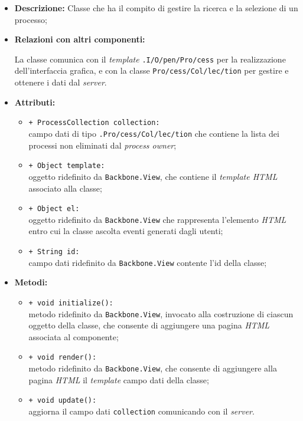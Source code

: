 \begin{flushleft}
\begin{itemize}
\item \textbf{Descrizione:} Classe che ha il compito di gestire la ricerca e la selezione di un processo;
\item \textbf{Relazioni con altri componenti:}
\begin{sloppypar}
La classe comunica con il \textit{template} \texttt{\viewAdmin{}.I\fshyp{}O\fshyp{}pen\fshyp{}Pro\fshyp{}cess} per la realizzazione dell'interfaccia grafica, e con la classe \texttt{\collection{}Pro\fshyp{}cess\fshyp{}Col\fshyp{}lec\fshyp{}tion} per gestire e ottenere i dati dal \textit{server}.
\end{sloppypar}
\item \textbf{Attributi:}
\begin{sloppypar}
\begin{itemize}
\item \texttt{+ ProcessCollection collection:}\\ campo dati di tipo \texttt{\collection{}.Pro\fshyp{}cess\fshyp{}Col\fshyp{}lec\fshyp{}tion} che contiene la lista dei processi non eliminati dal \textit{process owner};
\item \texttt{+ Object template:}\\ oggetto ridefinito da \texttt{Backbone.View}, che contiene il \textit{template HTML} associato alla classe;
\item \texttt{+ Object el:}\\ oggetto ridefinito da \texttt{Backbone.View} che rappresenta l'elemento \textit{HTML} entro cui la classe ascolta eventi generati dagli utenti;
\item \texttt{+ String id:}\\ campo dati ridefinito da \texttt{Backbone.View} contente l'id della classe;
\end{itemize}
\end{sloppypar}
\item \textbf{Metodi:}
\begin{sloppypar}
\begin{itemize}
\item \texttt{+ void initialize():}\\ metodo ridefinito da \texttt{Backbone.View}, invocato alla costruzione di ciascun oggetto della classe, che consente di aggiungere una pagina \textit{HTML} associata al componente;
\item \texttt{+ void render():}\\ metodo ridefinito da \texttt{Backbone.View}, che consente di aggiungere alla pagina \textit{HTML} il \textit{template} campo dati della classe;
\item \texttt{+ void update():}\\ aggiorna il campo dati \texttt{collection} comunicando con il \textit{server}.
\end{itemize}
\end{sloppypar}
\end{itemize}
\end{flushleft}


